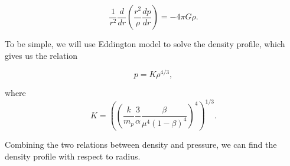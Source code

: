 \documentclass{tufte-handout}
\begin{document}
\begin{equation*}
    \frac{1}{r^2} \frac{d}{dr} \left( \frac{r^2}{\rho} \frac{dp}{dr} \right) = -4\pi G\rho.
\end{equation*}

To be simple, we will use Eddington model to solve the density profile, which gives us the relation

\begin{equation*}
    p = K \rho^{4/3},
\end{equation*}


where 
\begin{equation*}
    K = \left(  \left( \frac{k}{m_p} \frac{3}{\alpha} \frac{\beta}{\mu^4(1-\beta)^4}  \right)^4  \right)^{1/3}.
\end{equation*}

Combining the two relations between density and pressure, we can find the density profile with respect to radius.








\end{document}

